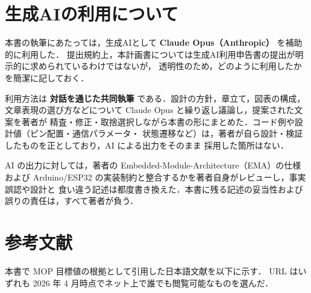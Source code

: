 \documentclass[lualatex,book,paper=a4paper,jafontsize=11.5pt,jafontscale=1.05]{jlreq}
\begin{document}
\chapter{生成AIの利用について}\label{chap:ai-usage}

本書の執筆にあたっては，生成AIとして \textbf{Claude Opus（Anthropic）} を補助的に利用した．
提出規約上，本計画書については生成AI利用申告書の提出が明示的に求められているわけではないが，
透明性のため，どのように利用したかを簡潔に記しておく．

利用方法は \textbf{対話を通じた共同執筆} である．設計の方針，章立て，図表の構成，
文章表現の選び方などについて Claude Opus と繰り返し議論し，提案された文案を著者が
精査・修正・取捨選択しながら本書の形にまとめた．コード例や設計値（ピン配置・通信パラメータ・
状態遷移など）は，著者が自ら設計・検証したものを正としており，AI による出力をそのまま
採用した箇所はない．

AI の出力に対しては，著者の Embedded-Module-Architecture（EMA）の仕様および
Arduino/ESP32 の実装制約と整合するかを著者自身がレビューし，事実誤認や設計と
食い違う記述は都度書き換えた．本書に残る記述の妥当性および誤りの責任は，すべて著者が負う．


\chapter{参考文献}\label{chap:references}

本書で MOP 目標値の根拠として引用した日本語文献を以下に示す．
URL はいずれも 2026 年 4 月時点でネット上で誰でも閲覧可能なものを選んだ．
\end{document}
